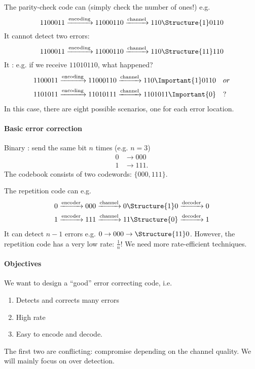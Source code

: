 \documentclass[a4paper, 11pt, openany]{book}
\begin{document}
%

The parity-check code can  (simply check the number of ones!) e.g.
\[
	1100011 \xrightarrow{\text{encoding}} 11000110 \xrightarrow{\text{channel}} 110\Structure{1}0110
\]
It cannot detect two errors:
\[
	1100011 \xrightarrow{\text{encoding}} 11000110 \xrightarrow{\text{channel}} 110\Structure{11}110
\]
It : e.g. if we receive $11010110$, what happened?
\begin{align*}
	1100011 \xrightarrow{\text{encoding}} 11000110 &\xrightarrow{\text{channel}} 110\Important{1}0110 \quad or \\
	1101011 \xrightarrow{\text{encoding}} 11010111 &\xrightarrow{\text{channel}} 1101011\Important{0} \quad ?
\end{align*}
In this case, there are eight possible scenarios, one for each error location.


\paragraph{Basic error correction}
Binary : send the same bit $n$ times (e.g. $n=3$)
\begin{align*}
	0 &\to 000\\
	1 &\to 111.
\end{align*}
The codebook consists of two codewords: $\{000,111\}$.

The repetition code can  e.g.
\begin{align*}
	0 &\xrightarrow{\text{encoder}} 000 \xrightarrow{\text{channel}} 0\Structure{1}0 \xrightarrow{\text{decoder}} 0\\
	1 &\xrightarrow{\text{encoder}} 111 \xrightarrow{\text{channel}} 11\Structure{0} \xrightarrow{\text{decoder}} 1
\end{align*}
It can detect $n-1$ errors e.g. $0 \to 000 \to \Structure{11}0$. However, the repetition code has a very low rate: $\frac{1}{n}$! We need more rate-efficient techniques.



\paragraph{Objectives}
We want to design a ``good'' error correcting code, i.e.
\begin{enumerate}
	\item Detects and corrects many errors
	\item High rate
	\item Easy to encode and decode.
\end{enumerate}
The first two are conflicting: compromise depending on the channel quality. We will mainly focus on  over detection.
\end{document}
